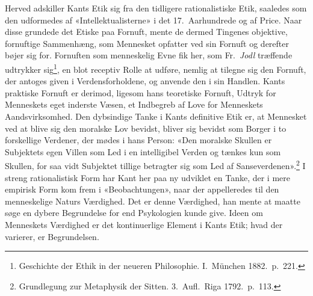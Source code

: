 \documentclass[12pt,a4paper]{article}
\newcommand{\apage}[1]{\marginnote{\footnotesize\textit{[#1]}}}
\begin{document}
Herved adskiller Kants Etik sig fra den tidligere rationalistiske Etik,
saaledes som den udformedes af «Intellektualisterne» i det 17.\
Aarhundrede og af Price. Naar disse grundede det Etiske paa Fornuft,
mente de dermed Tingenes objektive, fornuftige \apage{46} Sammenhæng, som Mennesket
opfatter ved sin Fornuft og derefter bøjer sig for. Fornuften som
menneskelig Evne fik her, som Fr.\ \emph{Jodl} træffende udtrykker
sig\footnote{Geschichte der Ethik in der neueren Philosophie.
I.\ München 1882.\ p.\ 221.}, en blot receptiv Rolle at udføre, nemlig at
tilegne sig den Fornuft, der antoges given i Verdensforholdene, og
anvende den i sin Handlen. Kants praktiske Fornuft er derimod, ligesom
hans teoretiske Fornuft, Udtryk for Menneskets eget inderste Væsen, et
Indbegreb af Love for Menneskets Aandsvirksomhed. Den dybsindige Tanke i
Kants definitive Etik er, at Mennesket ved at blive sig den moralske Lov
bevidst, bliver sig bevidst som Borger i to forskellige Verdener, der
mødes i hans Person: «Den moralske Skullen er Subjektets egen Villen som
Led i en intelligibel Verden og tænkes kun som Skullen, for saa vidt
Subjektet tillige betragter sig som Led af
Sanseverdenen».\footnote{Grundlegung zur Metaphysik der Sitten.
3.\ Aufl.\ Riga 1792.\ p.\ 113.} I streng rationalistisk Form har Kant
her paa ny udviklet en Tanke, der i mere empirisk Form kom frem i
«Beobachtungen», naar der appelleredes til den menneskelige Naturs
Værdighed. Det er denne Værdighed, han mente at maatte søge en dybere
Begrundelse for end Psykologien kunde give. Ideen om Menneskets Værdighed
er det kontinuerlige Element i Kants Etik; hvad der varierer, er
Begrundelsen.
\end{document}
